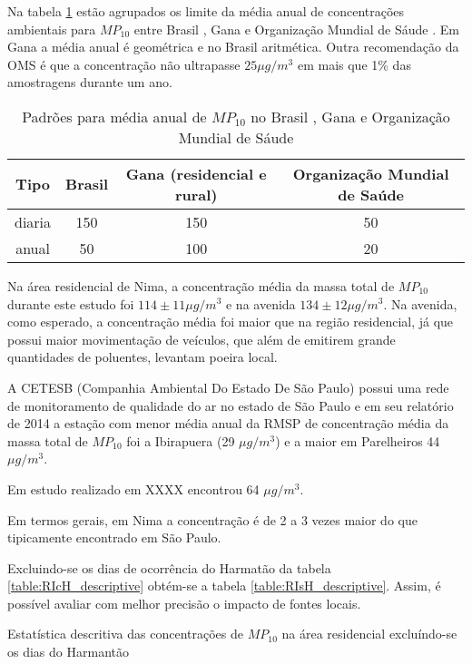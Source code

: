 Na tabela \ref{table:pm10standards} estão agrupados os limite da média anual de 
concentrações ambientais para $MP_{10}$ entre Brasil \citep{conama1990}, 
Gana \citep{epa2015} e Organização Mundial de Sáude \citep{who}. 
Em Gana a média anual é geométrica e no Brasil aritmética.
Outra recomendação da OMS é que a concentração não ultrapasse $25 \mu g/m^3$ 
em mais que 1\% das amostragens durante um ano. 

\begin{table}[H]
  \centering
      \begin{tabular}{cccc}
     \hline
   Tipo & Brasil & Gana (residencial e rural) & Organização Mundial de Saúde \\
     \hline
   diaria & 150 & 150 &  50 \\
     anual &  50 & 100 &  20 \\
      \hline
  \end{tabular}
  \caption{Padrões para média anual de $MP_{10}$ no Brasil \citep{conama1990}, 
           Gana \citep{epa2015} e 
           Organização Mundial de Sáude \citep{who}
           \label{table:pm10standards}}
\end{table}

Na área residencial de Nima, a concentração média da massa total de $MP_{10}$ 
durante este estudo foi $114\pm 11 \mu g / m^3$ e na avenida 
$134\pm 12 \mu g / m^3$. Na avenida, como esperado, a concentração média 
foi maior que na região residencial, já que possui maior movimentação de 
veículos, que além de emitirem grande quantidades de poluentes, levantam 
poeira local. 

A CETESB (Companhia Ambiental Do Estado De São Paulo) possui uma rede de 
monitoramento de qualidade do ar no estado de São Paulo e em seu relatório 
de 2014 \citep{cetesb2014} a estação com menor média anual da RMSP 
de concentração média da massa total de $MP_{10}$ foi a Ibirapuera 
(29 $\mu g / m^3$) e a maior em Parelheiros 44 $\mu g / m^3$.  

Em estudo realizado em XXXX \cite{souza2014} encontrou 64 $\mu g / m^3$.

Em termos gerais, em Nima a concentração é de 2 a 3 vezes maior do que 
tipicamente encontrado em São Paulo. 

Excluindo-se os dias de ocorrência do Harmatão da tabela 
\ref{table:RIcH_descriptive} obtém-se a tabela \ref{table:RIsH_descriptive}.
Assim, é possível avaliar com melhor precisão o impacto de fontes locais.  

\begin{table}[H]
  \centering
    
  \caption{Estatística descritiva das concentrações de  $MP_{10}$ na área 
           residencial excluíndo-se os dias do Harmantão
            \label{table:RIsH_descriptive}}
\end{table}

